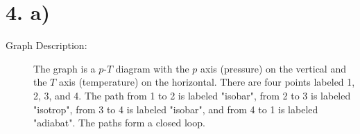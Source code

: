 \section*{4. a)}

\begin{description}
    \item[Graph Description:] The graph is a $p$-$T$ diagram with the $p$ axis (pressure) on the vertical and the $T$ axis (temperature) on the horizontal. There are four points labeled 1, 2, 3, and 4. The path from 1 to 2 is labeled "isobar", from 2 to 3 is labeled "isotrop", from 3 to 4 is labeled "isobar", and from 4 to 1 is labeled "adiabat". The paths form a closed loop.
\end{description}